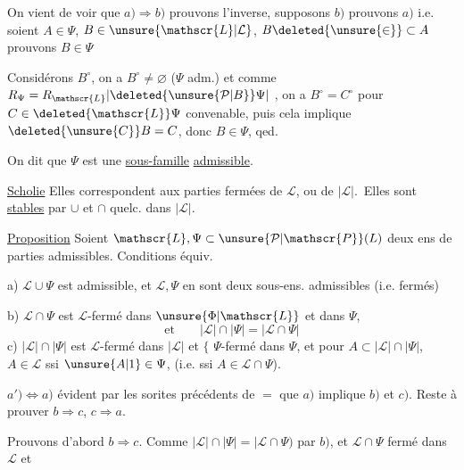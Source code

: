 On vient de voir que $a)\Rightarrow b)$ prouvons l'inverse, supposons $b)$ prouvons $a)$ i.e. soient $A\in\Psi$, $B\in\unsure{\mathscr{L}|\mathcal{L}}$, $B\deleted{\unsure{\in}}\subset A$ prouvons $B\in\Psi$

Considérons $B^\circ$, on a $B^\circ\ne\varnothing$ ($\Psi$ adm.) et comme $R_\Psi=R_{\mathscr{L}}\lvert\deleted{\unsure{\mathcal{P}|B}}\Psi\rvert$ , on a $B^\circ=C^\circ$ pour $C\in\deleted{\mathscr{L}}\Psi$ convenable, puis cela implique $\deleted{\unsure{C}}B=C$, donc $B\in\Psi$, qed.

On dit que $\Psi$ est une \uline{sous-famille} \uline{admissible}.

\uline{Scholie} Elles correspondent  aux parties fermées de $\mathscr{L}$, ou de $|\mathscr{L}|$. \unsure{\ensuremath{\Rightarrow}|=}\,Elles sont \uline{stables} par $\cup$ et $\cap$ quelc. dans $|\mathscr{L}|$.

\uline{Proposition} Soient $\mathscr{L},\Psi\subset\unsure{\mathcal{P}|\mathscr{P}}(L)$ deux ens de parties admissibles. Conditions équiv.

a) $\mathscr{L}\cup\Psi$ est admissible, et $\mathscr{L},\Psi$ en sont deux sous-ens. admissibles (i.e. fermés)

b) $\mathscr{L}\cap\Psi$ est $\mathscr{L}$-fermé dans $\unsure{\Phi|\mathscr{L}}$ et  dans $\Psi$,
\[
 \text{et}\qquad |\mathscr{L}|\cap|\Psi|=|\mathscr{L}\cap\Psi|
\]
c) $|\mathscr{L}|\cap|\Psi|$ est $\mathscr{L}$-fermé dans $|\mathscr{L}|$ et \ensuremath{\{} $\Psi$-fermé dans $\Psi$, et   pour $A\subset|\mathscr{L}|\cap|\Psi|$, $A\in\mathscr{L}$  ssi $\unsure{A|1}\in\Psi$, (i.e. ssi $A\in\mathscr{L}\cap\Psi$).


$a')\Leftrightarrow a)$ évident par les sorites précédents de \ensuremath{=} que $a)$ implique $b)$ et $c)$. Reste à prouver $b\Rightarrow c$, $c\Rightarrow a$.

Prouvons d'abord $b\Rightarrow c$. Comme $|\mathscr{L}|\cap|\Psi|=\lvert\mathscr{L}\cap\Psi)$ par $b)$, et $\mathscr{L}\cap\Psi$ fermé dans $\mathscr{L}$ et
